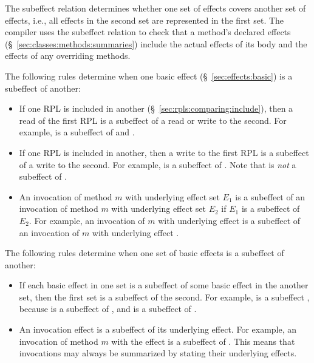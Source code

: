The subeffect relation determines whether one set of effects covers
another set of effects, i.e., all effects in the second set are
represented in the first set.  The compiler uses the subeffect
relation to check that a method's declared effects
(\S~\ref{sec:classes:methods:summaries}) include the actual effects of
its body and the effects of any overriding methods.

  The following rules determine when one basic
effect (\S~\ref{sec:effects:basic}) is a subeffect of another:
%
\begin{itemize}
%
\item If one RPL is included in another
  (\S~\ref{sec:rpls:comparing:include}), then a read of the first RPL
  is a subeffect of a read or write to the second.  For example,
   is a subeffect of  and
  .
%
\item If one RPL is included in another, then a write to the first RPL
  is a subeffect of a write to the second.  For example,  is a subeffect of .  Note that
   is \emph{not} a subeffect of .
%
\item An invocation of method $m$ with underlying effect set $E_1$ is
  a subeffect of an invocation of method $m$ with underlying effect
  set $E_2$ if $E_1$ is a subeffect of $E_2$.  For example, an
  invocation of $m$ with underlying effect  is a
  subeffect of an invocation of $m$ with underlying effect .
%
\end{itemize}

  The following rules determine when one set of
basic effects is a subeffect of another:
%
\begin{itemize}
%
\item If each basic effect in one set is a subeffect of some basic
  effect in the another set, then the first set is a subeffect of the
  second.  For example,  is a subeffect
  , because  is a subeffect of
  , and  is a subeffect of .
%
\item An invocation effect is a subeffect of its underlying effect.
  For example, an invocation of method $m$ with the effect  is a subeffect of .  This means that invocations
  may always be summarized by stating their underlying effects.
%
\end{itemize}

